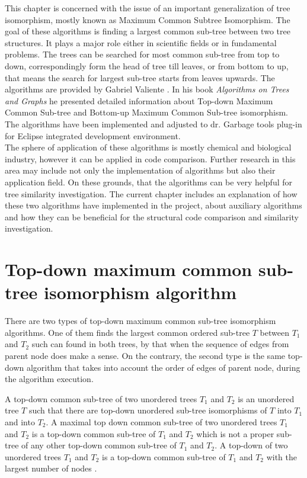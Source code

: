 \documentclass{report}
\begin{document}
This chapter is concerned with the issue of an important generalization of tree isomorphism, mostly known as Maximum Common Subtree Isomorphism. The goal of these algorithms is finding a largest common sub-tree between two tree structures. It plays a major role either in scientific fields or in fundamental problems. The trees can be searched for most common sub-tree from top to down, correspondingly form the head of tree till leaves, or from bottom to up, that means the search for largest sub-tree starts from leaves upwards. The algorithms are provided by Gabriel Valiente \cite{valiente}. In his book \emph{Algorithms on Trees and Graphs} he presented detailed information about Top-down Maximum Common Sub-tree and Bottom-up Maximum Common Sub-tree isomorphism. The algorithms have been implemented and adjusted to dr. Garbage tools plug-in for Eclipse integrated development environment.
\\
The sphere of application of these algorithms is mostly chemical and biological industry, however it can be applied in code comparison. Further research in this area may include not only the implementation of algorithms but also their application field. On these grounds, that the algorithms can be very helpful for tree similarity investigation. The current chapter includes an explanation of how these two algorithms have implemented in the project, about auxiliary algorithms and how they can be beneficial for the structural code comparison and similarity investigation.



\section{Top-down maximum common sub-tree isomorphism algorithm}
\label{sec:topdown}

There are two types of top-down maximum common sub-tree isomorphism algorithms. One of them finds the largest common ordered sub-tree $T$ between $ T_{1}$ and $ T_{2}$ such can found in both trees, by that when the sequence of edges from parent node does make a sense. On the contrary, the second type is the same top-down algorithm that takes into account the order of edges of parent node, during the algorithm execution. 

A top-down common sub-tree of two unordered trees $ T_{1}$ and $ T_{2 }$ is an unordered tree $T$ such that there are top-down unordered sub-tree isomorphisms of $ T$ into $ T_{1}$ and into $ T_{2}$. A maximal top down common sub-tree of two unordered  trees $ T_{1}$ and $ T_{2}$ is a top-down common sub-tree of $ T_{1}$ and $ T_{2}$ which is not a proper sub-tree of any other top-down common sub-tree of $ T_{1}$ and $ T_{2}$. A top-down of two unordered trees $ T_{1}$ and $ T_{2}$ is a top-down common sub-tree of $ T_{1}$ and $ T_{2}$ with the largest number of nodes \cite{valiente}.
\end{document}
